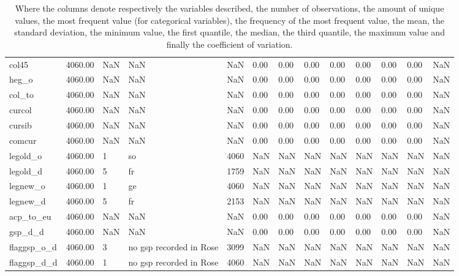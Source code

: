 \documentclass{Trade_template}
\numberwithin{equation}{section}
\begin{document}
\begin{table}
{\begin{tabularx}{\textwidth}{@{} L *{12}{Y}  @{}}
col45 & 4060.00 & NaN & NaN & NaN & 0.00 & 0.00 & 0.00 & 0.00 & 0.00 & 0.00 & 0.00 & NaN \\
heg\_o & 4060.00 & NaN & NaN & NaN & 0.00 & 0.00 & 0.00 & 0.00 & 0.00 & 0.00 & 0.00 & NaN \\
col\_to & 4060.00 & NaN & NaN & NaN & 0.00 & 0.00 & 0.00 & 0.00 & 0.00 & 0.00 & 0.00 & NaN \\
curcol & 4060.00 & NaN & NaN & NaN & 0.00 & 0.00 & 0.00 & 0.00 & 0.00 & 0.00 & 0.00 & NaN \\
cursib & 4060.00 & NaN & NaN & NaN & 0.00 & 0.00 & 0.00 & 0.00 & 0.00 & 0.00 & 0.00 & NaN \\
comcur & 4060.00 & NaN & NaN & NaN & 0.00 & 0.00 & 0.00 & 0.00 & 0.00 & 0.00 & 0.00 & NaN \\
legold\_o & 4060.00 & 1 & so & 4060 & NaN & NaN & NaN & NaN & NaN & NaN & NaN & NaN \\
legold\_d & 4060.00 & 5 & fr & 1759 & NaN & NaN & NaN & NaN & NaN & NaN & NaN & NaN \\
legnew\_o & 4060.00 & 1 & ge & 4060 & NaN & NaN & NaN & NaN & NaN & NaN & NaN & NaN \\
legnew\_d & 4060.00 & 5 & fr & 2153 & NaN & NaN & NaN & NaN & NaN & NaN & NaN & NaN \\
acp\_to\_eu & 4060.00 & NaN & NaN & NaN & 0.00 & 0.00 & 0.00 & 0.00 & 0.00 & 0.00 & 0.00 & NaN \\
gsp\_d\_d & 4060.00 & NaN & NaN & NaN & 0.00 & 0.00 & 0.00 & 0.00 & 0.00 & 0.00 & 0.00 & NaN \\
flaggsp\_o\_d & 4060.00 & 3 & no gsp recorded in Rose & 3099 & NaN & NaN & NaN & NaN & NaN & NaN & NaN & NaN \\
flaggsp\_d\_d & 4060.00 & 1 & no gsp recorded in Rose & 4060 & NaN & NaN & NaN & NaN & NaN & NaN & NaN & NaN \\ \bottomrule
\end{tabularx}}
\caption*{\tiny{Where the columns denote respectively the variables described, the number of observations, the amount of unique values, the most frequent value (for categorical variables), the frequency of the most frequent value, the mean, the standard deviation, the minimum value, the first quantile, the median, the third quantile, the maximum value and finally the coefficient of variation.}}
\end{table}
\end{document}
